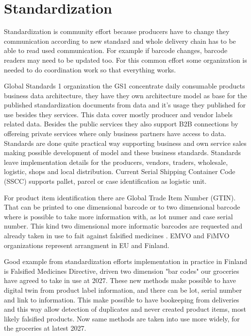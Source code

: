 \section{Standardization}
\label{standardization}
Standardization is community effort because producers have to change they
communication according to new standard and whole delivery chain has to be
able to read used communication. For example if barcode changes, barcode
readers may need to be updated too. For this common effort some organization
is needed to do coordination work so that everything works.

Global Standards 1 organization the GS1\cite{GS1Standards} concentrate daily
consumable products business data architecture, they have they own architecture
model as base for the published standardization documents from data and it's
usage they published for use besides they services. This data cover mostly
producer and vendor labels related data. Besides the public services they also
support B2B connections by offereing private services where only business
partners have access to data. Standards are done quite practical way supporting
business and own service sales making possible development of model and these
business standards. Standards leave implementation details for the producers,
vendors, traders, wholesale, logistic, shops and local distribution. Current
Serial Shipping Container Code (SSCC)\cite{SSCC} supports pallet, parcel or
case identification as logistic unit.

For product item identification there are Global Trade Item Number
(GTIN)\cite{GTIN}. That can be printed to one dimensional barcode or to two
dimensional barcode where is possible to take more information with, as
lot numer and case serial number. This kind two dimensional more informatic
barcodes are requested and already taken in use to fait against falsified
medicines \cite{FalsifiedMedicines}. EMVO\cite{EMVO} and FiMVO\cite{FiMVO}
organizations represent arrangment in EU and Finland.

Good example from standardization efforts implementation in practice in
Finland is Falsified Medicines
Directive\cite{Falsified_Medicines_Directive}\cite{FalsifiedMedicines}\cite{EMVO}\cite{FiMVO},
driven two dimension "bar codes" our groceries have agreed to take in use at
2027\cite{GS1DL2027}\cite{Finland2DcodesY27}. These new methods make possible
to have digital twin from product label information, and there can be lot,
serial number and link to information. This make possible to have bookeeping
from deliveries and this way allow detection of duplicates and never created
product items, most likely falsified products. Now same methods are taken into
use more widely, for the groceries at latest 2027.

